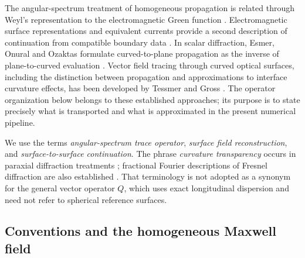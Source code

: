 \documentclass[11pt,a4paper]{article}
\numberwithin{equation}{section}
\begin{document}
The angular-spectrum treatment of homogeneous propagation is related through
Weyl's representation to the electromagnetic Green function
\cite{Weyl1919}. Electromagnetic surface representations and equivalent currents
provide a second description of continuation from compatible boundary data
\cite{Schelkunoff1936,StrattonChu1939}. In scalar diffraction, Esmer, Onural and
Ozaktas formulate curved-to-plane propagation as the inverse of plane-to-curved
evaluation \cite{Esmer2011}. Vector field tracing through curved optical
surfaces, including the distinction between propagation and approximations to
interface curvature effects, has been developed by Tessmer and Gross
\cite{Tessmer2015a,Tessmer2015b}. The operator organization below belongs to
these established approaches; its purpose is to state precisely what is
transported and what is approximated in the present numerical pipeline.

We use the terms \emph{angular-spectrum trace operator}, \emph{surface field
reconstruction}, and \emph{surface-to-surface continuation}. The phrase
\emph{curvature transparency} occurs in paraxial diffraction treatments
\cite{Lasso2013}; fractional Fourier descriptions of Fresnel diffraction are
also established \cite{PellatFinet1994}. That terminology is not adopted as a
synonym for the general vector operator $Q$, which uses exact longitudinal
dispersion and need not refer to spherical reference surfaces.

\subsection{Conventions and the homogeneous Maxwell field}
\end{document}
